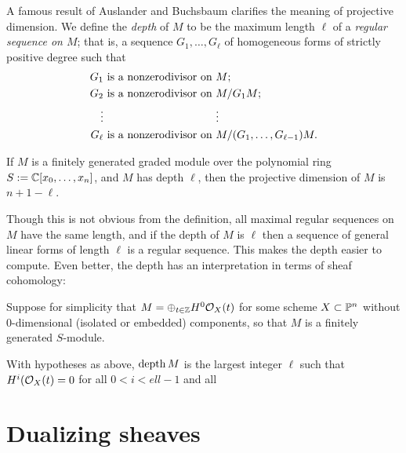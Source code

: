 
A famous result of Auslander and Buchsbaum clarifies the meaning of projective dimension. We define the 
\emph{depth} of $M$ to be the maximum length $\ell$ of a \emph{regular sequence on $M$}; that is, a sequence $G_{1},\dots,G_{\ell}$ of homogeneous forms of strictly positive degree such that 
\begin{align*}
G_{1} &\hbox{ is a nonzerodivisor on } M;\\
G_{2} &\hbox{ is a nonzerodivisor on } M/G_{1}M;\\
\vdots&\phantom{\hbox{ is a nonzerodivisor on } }\vdots\\
G_{\ell} &\hbox{ is a nonzerodivisor on } M/(G_{1},\dots,G_{\ell-1})M.
\end{align*}

\begin{theorem}
If $M$ is a finitely generated graded module over the polynomial ring $S := {\mathbb C}[x_{0},\dots,x_{n}]$, and $M$ has depth $\ell$, then the projective dimension of $M$ is $n+1-\ell$.
\end{theorem}

Though this is not obvious from the definition, all maximal regular sequences on $M$ have the same length, and if the depth of $M$ is $\ell$ then a sequence of general linear forms of length $\ell$ is a regular sequence. This makes the depth easier to compute. Even better, the depth has an interpretation in terms of sheaf cohomology:

Suppose for simplicity that $M = \oplus_{t\in {\mathbb Z}}H^{0}{\mathcal O}_{X}(t)$ for some scheme $X\subset {\mathbb P}^{n}$ without 0-dimensional (isolated or embedded) components, so that $M$ is a finitely generated $S$-module. 
\begin{theorem}
 With hypotheses as above, $\operatorname{depth} M$ is the largest integer $\ell$ such that $H^{i}({\mathcal O}_{X}(t) = 0$ for all $0<i<ell-1$ and all 
\end{theorem}


\section {Dualizing sheaves} 

